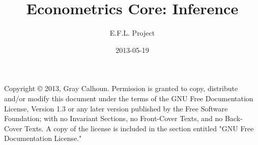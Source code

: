 \documentclass[nofonts]{tufte-latex/tufte-book}
\title{Econometrics Core: Inference}
\author{E.F.L. Project}
\date{2013-05-19}
\begin{document}
\maketitle

Copyright © 2013, Gray Calhoun.  Permission is granted to copy,
distribute and/or modify this document under the terms of the GNU Free
Documentation License, Version 1.3 or any later version published by
the Free Software Foundation; with no Invariant Sections, no
Front-Cover Texts, and no Back-Cover Texts.  A copy of the license is
included in the section entitled "GNU Free Documentation License."

\tableofcontents







\appendix

\end{document}
